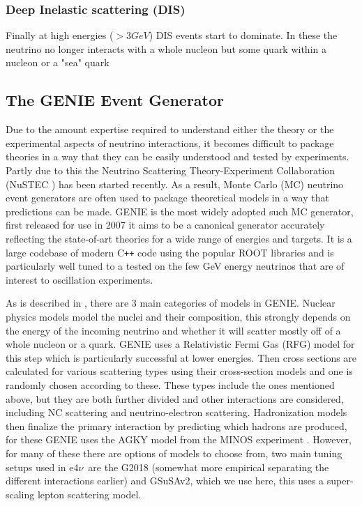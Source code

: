 \documentclass[a4paper,12pt]{article}
\newcommand{\efn}{e4$\nu$}
\begin{document}
\subsubsection{Deep Inelastic scattering (DIS)}
Finally at high energies ($>3\si{GeV}$) DIS events start to dominate.
In these the neutrino no longer interacts with a whole nucleon but some quark within a nucleon or a "sea" quark

\subsection{The GENIE Event Generator \cite{andreopoulosGENIENeutrinoMonte2010}}\label{sec:genie}
Due to the amount expertise required to understand either the theory or the experimental aspects of neutrino interactions, it becomes difficult to package theories in a way that they can be easily understood and tested by experiments.
Partly due to this the Neutrino Scattering Theory-Experiment Collaboration (NuSTEC \cite{alvarez-rusoNuSTEC11NeutrinoScattering2018}) has been started recently.
As a result, Monte Carlo (MC) neutrino event generators are often used to package theoretical models in a way that predictions can be made.
GENIE is the most widely adopted such MC generator, first released for use in 2007 it aims to be a canonical generator accurately reflecting the state-of-art theories for a wide range of energies and targets.
It is a large codebase of modern C\texttt{++} code using the popular ROOT libraries\cite{brunROOTObjectOriented1997} and is particularly well tuned to a tested on the few \si{GeV} energy neutrinos that are of interest to oscillation experiments.

As is described in \cite{andreopoulosGENIENeutrinoMonte2010}, there are 3 main categories of models in GENIE.
Nuclear physics models model the nuclei and their composition, this strongly depends on the energy of the incoming neutrino and whether it will scatter mostly off of a whole nucleon or a quark.
GENIE uses a Relativistic Fermi Gas (RFG) model for this step which is particularly successful at lower energies.
Then cross sections are calculated for various scattering types using their cross-section models and one is randomly chosen according to these.
These types include the ones mentioned above, but they are both further divided and other interactions are considered, including NC scattering and neutrino-electron scattering.
Hadronization models then finalize the primary interaction by predicting which hadrons are produced, for these GENIE uses the AGKY model from the MINOS experiment \cite{HadronizationModelMINOS}.
However, for many of these there are options of models to choose from, two main tuning setups used in \efn\ are the G2018 (somewhat more empirical separating the different interactions earlier) and GSuSAv2, which we use here, this uses a super-scaling lepton scattering model\cite{amaroNeutrinonucleusScatteringSuSA2021}.
\end{document}
